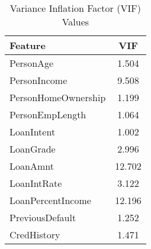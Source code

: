 \begin{table}[H]\centering
\caption{Variance Inflation Factor (VIF) Values}
\label{Table 4:vif_values}
\begin{tabular}{lc}
\toprule
Feature & VIF \\
\midrule
PersonAge & 1.504 \\
PersonIncome & 9.508 \\
PersonHomeOwnership & 1.199 \\
PersonEmpLength & 1.064 \\
LoanIntent & 1.002 \\
LoanGrade & 2.996 \\
LoanAmnt & 12.702 \\
LoanIntRate & 3.122 \\
LoanPercentIncome & 12.196 \\
PreviousDefault & 1.252 \\
CredHistory & 1.471 \\
\bottomrule
\end{tabular}
\end{table}

